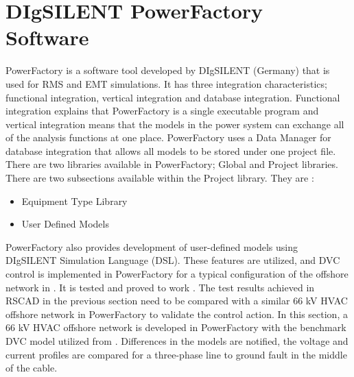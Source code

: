 
\section{DIgSILENT PowerFactory Software}
PowerFactory is a software tool developed by DIgSILENT (Germany) that is used for RMS and \gls{EMT} simulations. It has three integration characteristics; functional integration, vertical integration and database integration. Functional integration explains that PowerFactory is a single executable program and vertical integration means that the models in the power system can exchange all of the analysis functions at one place. PowerFactory uses a Data Manager for database integration that allows all models to be stored under one project file. There are two libraries available in PowerFactory; Global and Project libraries. There are two subsections available within the Project library. They are \cite{powerfactory_tech}:
\begin{itemize}
    \item Equipment Type Library
    \item User Defined Models
\end{itemize}
PowerFactory also provides development of user-defined models using DIgSILENT Simulation Language (DSL). These features are utilized, and \gls{DVC} control is implemented in PowerFactory for a typical configuration of the offshore network in \cite{korai_dynamic_2019}. It is tested and proved to work \cite{korai_dynamic_2019}. The test results achieved in RSCAD in the previous section need to be compared with a similar 66 kV \gls{HVAC} offshore network in PowerFactory to validate the control action. In this section, a 66 kV \gls{HVAC} offshore network is developed in PowerFactory with the benchmark \gls{DVC} model utilized from \cite{korai_dynamic_2019}. Differences in the models are notified, the voltage and current profiles are compared for a three-phase line to ground fault in the middle of the cable.

